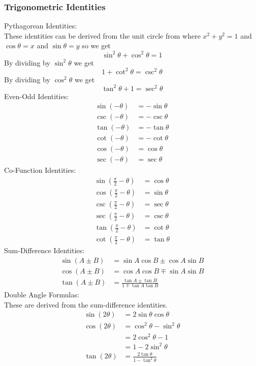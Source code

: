 \subsubsection{Trigonometric Identities}
Pythagorean Identities:\\
These identities can be derived from the unit circle from where $x^2+y^2=1$ and $\cos\theta = x$ and $\sin\theta=y$ so we get
$$\sin^2\theta+\cos^2\theta=1$$
By dividing by $\sin^2\theta$ we get
$$1+\cot^2\theta=\csc^2\theta$$
By dividing by $\cos^2\theta$ we get 
$$\tan^2\theta+1=\sec^2\theta$$
Even-Odd Identities:
\begin{align*}
    \sin(-\theta)&=-\sin\theta\\
    \csc(-\theta)&=-\csc\theta\\
    \tan(-\theta)&=-\tan\theta\\
    \cot(-\theta)&=-\cot\theta\\
    \cos(-\theta)&=\cos\theta\\
    \sec(-\theta)&=\sec\theta
\end{align*}
Co-Function Identities:
\begin{align*}
    \sin\left(\frac{\pi}{2}-\theta\right)&=\cos\theta\\
    \cos\left(\frac{\pi}{2}-\theta\right)&=\sin\theta\\
    \csc\left(\frac{\pi}{2}-\theta\right)&=\sec\theta\\
    \sec\left(\frac{\pi}{2}-\theta\right)&=\csc\theta\\
    \tan\left(\frac{\pi}{2}-\theta\right)&=\cot\theta\\
    \cot\left(\frac{\pi}{2}-\theta\right)&=\tan\theta
\end{align*}
Sum-Difference Identities:
\begin{align*}
    \sin(A\pm B)&=\sin A\cos B\pm \cos A\sin B\\
    \cos(A\pm B)&=\cos A\cos B\mp \sin A\sin B\\
    \tan(A\pm B)&=\frac{\tan A\pm \tan B}{1\mp\tan A\tan B}
\end{align*}
Double Angle Formulas:\\
These are derived from the sum-difference identities.
\begin{align*}
    \sin(2\theta)&=2\sin\theta\cos\theta\\
    \cos(2\theta)&=\cos^2\theta-\sin^2\theta\\
    &=2\cos^2\theta-1\\
    &=1-2\sin^2\theta\\
    \tan(2\theta)&=\frac{2\tan\theta}{1-\tan^2\theta}
\end{align*}

